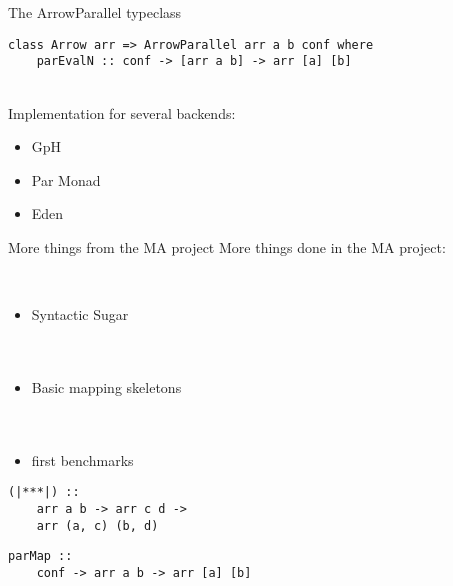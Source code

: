 
\begin{frame}[fragile]{The ArrowParallel typeclass}
\begin{lstlisting}[frame=htrbl]
class Arrow arr => ArrowParallel arr a b conf where
	parEvalN :: conf -> [arr a b] -> arr [a] [b]
\end{lstlisting}
~\\
Implementation for several backends:
\\
\begin{itemize}
\item GpH
\item Par Monad
\item Eden
\end{itemize}
\end{frame}

\begin{frame}[fragile]{More things from the MA project}
More things done in the MA project:
\\
\begin{minipage}{0.49\textwidth}
~\\
\begin{itemize}
\item Syntactic Sugar ~\\~\\~\\
\item Basic mapping skeletons ~\\~\\~\\
\item first benchmarks
\end{itemize}
\end{minipage}
\begin{minipage}{0.49\textwidth}
\begin{lstlisting}[frame=htrbl]
(|***|) ::
	arr a b -> arr c d ->
	arr (a, c) (b, d)
\end{lstlisting}
\begin{lstlisting}[frame=htrbl]
parMap ::
	conf -> arr a b -> arr [a] [b]
\end{lstlisting}
\end{minipage}
\end{frame}